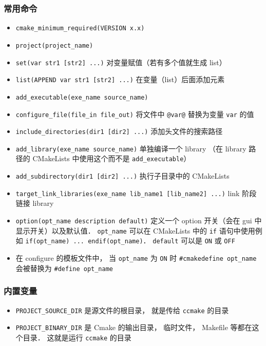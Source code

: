 \subsubsection{常用命令}
\begin{itemize}
\item \verb`cmake_minimum_required(VERSION x.x)`
\item \verb`project(project_name)`
\item \verb`set(var str1 [str2] ...)` 对变量赋值（若有多个值就生成 list）
\item \verb`list(APPEND var str1 [str2] ...)` 在变量（list）后面添加元素
\item \verb`add_executable(exe_name source_name)`
\item \verb`configure_file(file_in file_out)` 将文件中 \verb`@var@` 替换为变量 \verb`var` 的值
\item \verb`include_directories(dir1 [dir2] ...)` 添加头文件的搜索路径
\item \verb`add_library(exe_name source_name)` 单独编译一个 library （在 library 路径的 CMakeLists 中使用这个而不是 \verb`add_executable`）
\item \verb`add_subdirectory(dir1 [dir2] ...)` 执行子目录中的 CMakeLists
\item \verb`target_link_libraries(exe_name lib_name1 [lib_name2] ...)` link 阶段链接 library
\item \verb`option(opt_name description default)` 定义一个 option 开关（会在 gui 中显示开关）以及默认值． \verb`opt_name` 可以在 CMakeLists 中的 \verb`if` 语句中使用例如 \verb`if(opt_name) ... endif(opt_name)`． \verb`default` 可以是 \verb`ON` 或 \verb`OFF`
\item 在 configure 的模板文件中， 当 \verb`opt_name` 为 \verb`ON` 时 \verb`#cmakedefine opt_name` 会被替换为 \verb`#define opt_name`
\end{itemize}

\subsubsection{内置变量}
\begin{itemize}
\item \verb`PROJECT_SOURCE_DIR` 是源文件的根目录， 就是传给 \verb`ccmake` 的目录
\item \verb`PROJECT_BINARY_DIR` 是 Cmake 的输出目录， 临时文件， Makefile 等都在这个目录． 这就是运行 \verb`ccmake` 的目录
\end{itemize}

